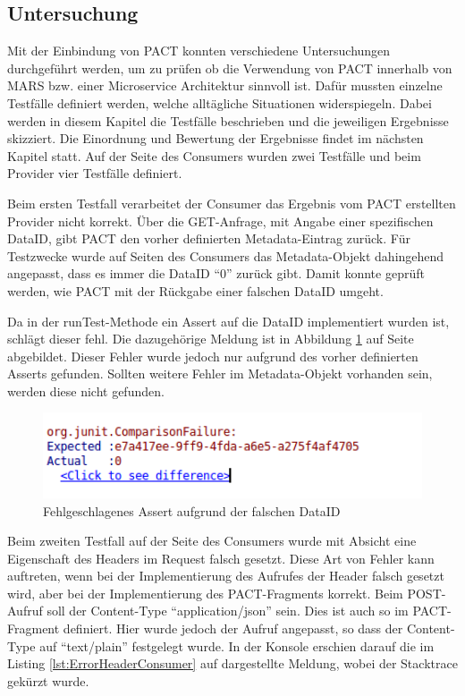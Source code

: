 \documentclass{llncs}
\begin{document}
\subsection{Untersuchung}
Mit der Einbindung von PACT konnten verschiedene Untersuchungen durchgeführt werden, um zu prüfen ob die Verwendung von PACT innerhalb von MARS bzw. einer Microservice Architektur sinnvoll ist. Dafür mussten einzelne Testfälle definiert werden, welche alltägliche Situationen widerspiegeln. Dabei werden in diesem Kapitel die Testfälle beschrieben und die jeweiligen Ergebnisse skizziert. Die Einordnung und Bewertung der Ergebnisse findet im nächsten Kapitel statt. Auf der Seite des Consumers wurden zwei Testfälle und beim Provider vier Testfälle definiert.

Beim ersten Testfall verarbeitet der Consumer das Ergebnis vom PACT erstellten Provider nicht korrekt. Über die GET-Anfrage, mit Angabe einer spezifischen DataID, gibt PACT den vorher definierten Metadata-Eintrag zurück. Für Testzwecke wurde auf Seiten des Consumers das Metadata-Objekt dahingehend angepasst, dass es immer die DataID \enquote{0} zurück gibt. Damit konnte geprüft werden, wie PACT mit der Rückgabe einer falschen DataID umgeht.

Da in der runTest-Methode ein Assert auf die DataID implementiert wurden ist, schlägt dieser fehl. Die dazugehörige Meldung ist in Abbildung \ref{fig:ErrorConsumerGet} auf Seite \pageref{fig:ErrorConsumerGet} abgebildet. Dieser Fehler wurde jedoch nur aufgrund des vorher definierten Asserts gefunden. Sollten weitere Fehler im Metadata-Objekt vorhanden sein, werden diese nicht gefunden.

\begin{figure}[htbp]
  \centering
      \includegraphics[width=1\textwidth]{./Images/Error_Consumer-GET}
    \caption{Fehlgeschlagenes Assert aufgrund der falschen DataID}
    \label{fig:ErrorConsumerGet}
\end{figure}

Beim zweiten Testfall auf der Seite des Consumers wurde mit Absicht eine Eigenschaft des Headers im Request falsch gesetzt. Diese Art von Fehler kann auftreten, wenn bei der Implementierung des Aufrufes der Header falsch gesetzt wird, aber bei der Implementierung des PACT-Fragments korrekt. Beim POST-Aufruf soll der Content-Type \enquote{application/json} sein. Dies ist auch so im PACT-Fragment definiert. Hier wurde jedoch der Aufruf angepasst, so dass der Content-Type auf \enquote{text/plain} festgelegt wurde. In der Konsole erschien darauf die im Listing \ref{lst:ErrorHeaderConsumer} auf \pageref{lst:ErrorHeaderConsumer} dargestellte Meldung, wobei der Stacktrace gekürzt wurde.
\end{document}
